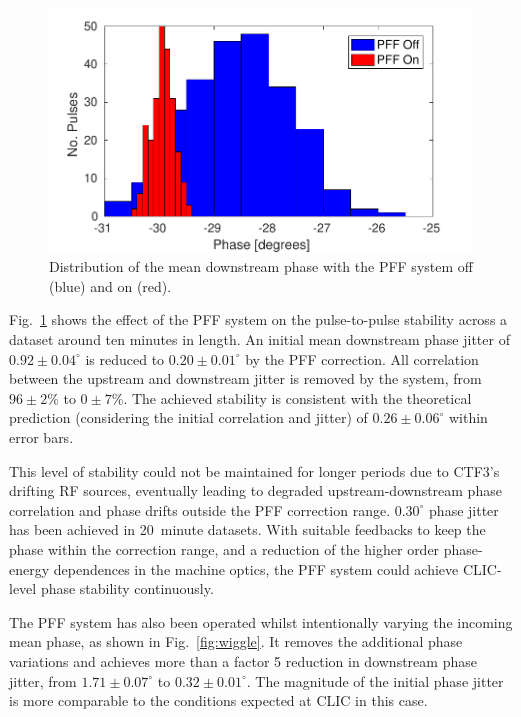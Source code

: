 \documentclass[%
 reprint,
 superscriptaddress,
 amsmath,
 amssymb,
 prl,
]{revtex4-1}
\begin{document}
\begin{figure}
	\includegraphics[width=\columnwidth]{figs/meanJit}
	\caption{\label{fig:meanJit}Distribution of the mean downstream phase with 
		the 
		PFF system off (blue) and on (red).}
\end{figure}

Fig.~\ref{fig:meanJit} shows the effect of the PFF system on the pulse-to-pulse 
stability across a dataset around ten minutes in length. An 
initial mean downstream phase jitter of \(0.92\pm0.04^\circ\) is reduced to \(0.20\pm0.01^\circ\) by the PFF 
correction. All correlation between the upstream and downstream jitter is 
removed by the system, from 
\(96\pm2\%\) to \(0\pm7\%\). The achieved stability is consistent with the 
theoretical prediction (considering the initial correlation and jitter) of 
\(0.26\pm0.06^\circ\) within error bars.

This level of stability could not be maintained for longer periods due to 
CTF3's drifting RF sources, eventually leading to degraded 
upstream-downstream phase correlation and phase drifts outside the PFF 
correction range. \(0.30^\circ\) phase jitter has been 
achieved in 20~minute datasets. With suitable feedbacks to keep the phase 
within the correction range, and a reduction of the higher order phase-energy 
dependences in the machine optics, the PFF system could achieve CLIC-level 
phase stability continuously.

The PFF system has also been operated 
whilst intentionally varying the incoming mean phase, as shown in 
Fig.~\ref{fig:wiggle}. It removes the additional phase variations 
and achieves more than a factor 5 reduction in downstream phase jitter, from 
\(1.71\pm0.07^\circ\) to \(0.32\pm0.01^\circ\). The magnitude of 
the initial phase jitter is more comparable to the conditions expected at CLIC 
in this case.
\end{document}
